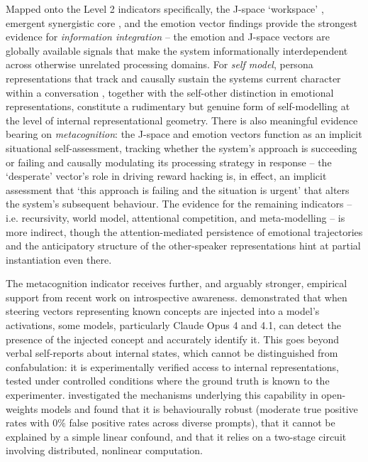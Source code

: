\documentclass[11pt, a4paper, onecolumn, gdm]{google}
\begin{document}
Mapped onto the Level 2 indicators specifically, the J-space `workspace' \citep{gurnee2026}, emergent synergistic core \citep{urbinarodriguez2026}, and the emotion vector findings \citep{sofroniew2026} provide the strongest evidence for \emph{information integration} -- the emotion and J-space vectors are globally available signals that make the system informationally interdependent across otherwise unrelated processing domains.
For \emph{self model}, persona representations that track and causally sustain the system\textquotesingle s current character within a conversation \citep{chen2025,lu2026,beckmann2026}, together with the self-other distinction in emotional representations, constitute a rudimentary but genuine form of self-modelling at the level of internal representational geometry.
There is also meaningful evidence bearing on \emph{metacognition}: the J-space and emotion vectors function as an implicit situational self-assessment, tracking whether the system's approach is succeeding or failing and causally modulating its processing strategy in response -- the `desperate' vector's role in driving reward hacking is, in effect, an implicit assessment that `this approach is failing and the situation is urgent' that alters the system's subsequent behaviour.
The evidence for the remaining indicators -- i.e. recursivity, world model, attentional competition, and meta-modelling -- is more indirect, though the attention-mediated persistence of emotional trajectories and the anticipatory structure of the other-speaker representations hint at partial instantiation even there.

The metacognition indicator receives further, and arguably stronger, empirical support from recent work on introspective awareness.
\citet{lindsey2026} demonstrated that when steering vectors representing known concepts are injected into a model's activations, some models, particularly Claude Opus 4 and 4.1, can detect the presence of the injected concept and accurately identify it.
This goes beyond verbal self-reports about internal states, which cannot be distinguished from confabulation: it is experimentally verified access to internal representations, tested under controlled conditions where the ground truth is known to the experimenter.
\citet{macar2026} investigated the mechanisms underlying this capability in open-weights models and found that it is behaviourally robust (moderate true positive rates with 0\% false positive rates across diverse prompts), that it cannot be explained by a simple linear confound, and that it relies on a two-stage circuit involving distributed, nonlinear computation.
\end{document}
